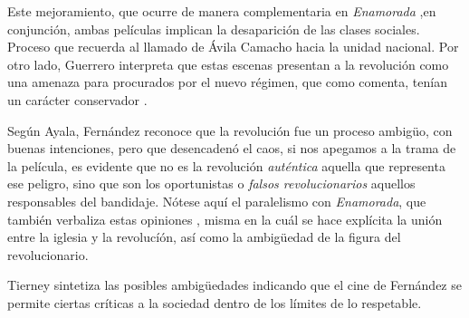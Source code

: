 Este mejoramiento, que ocurre de manera complementaria en \emph{Enamorada}\autocite[377]{sanchez_vi._2010}
,en conjunción, ambas películas implican la desaparición de las clases sociales\autocite[365]{sanchez_vi._2010}.
Proceso que recuerda al llamado de Ávila Camacho hacia la unidad nacional\autocite[366]{sanchez_vi._2010}.
Por otro lado, Guerrero interpreta que estas escenas presentan a la revolución como una amenaza\autocite[178]{guerrero_imagen_2005}
para procurados por el nuevo régimen,
que como comenta, tenían un carácter conservador\autocite[178]{guerrero_imagen_2005}
.

Según Ayala, Fernández reconoce que la revolución fue un proceso ambigüo, con buenas intenciones, pero que desencadenó el caos\autocite[36]{blanco_aventura_1993}, 
si nos apegamos a la trama de la película, es evidente que no es la revolución \emph{auténtica} aquella que representa ese peligro, sino que son los oportunistas o \emph{falsos revolucionarios} aquellos responsables del bandidaje.\autocite[48:07-48:40]{fernandez_flor_1943}
Nótese aquí el paralelismo con \emph{Enamorada}, que también verbaliza estas opiniones\autocite[14:11]{fernandez_enamorada_1946}\autocite[5:31]{fernandez_enamorada_1946}
, misma en la cuál se hace explícita la unión entre la iglesia y la revolucíón\autocite[377]{sanchez_vi._2010}, así como la ambigüedad de la figura del revolucionario\autocite[39:00]{fernandez_enamorada_1946}.

Tierney sintetiza  las posibles ambigüedades indicando que el cine de Fernández se permite ciertas críticas a la sociedad dentro de los límites de lo respetable\autocite[48]{tierney_myths_2002}.




\pagebreak
